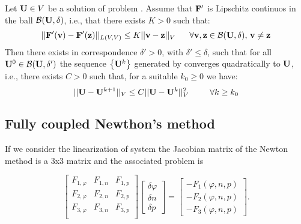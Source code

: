 \begin{Teorema}
\label{theorem: newton convergence}
Let  $\mathbf{U}\in V$ be a solution of problem . Assume that $\mathbf{F'}$ is Lipschitz continuos in the ball $\mathcal{B}(\mathbf{U},\delta)$, i.e., that there exists  $K>0$ such that:
\begin{equation}
||\vect{F'}(\vect{v})-\vect{F'}(\vect{z})||_{L(V,V)} \leq K ||\vect{v}-\vect{z}||_V \psp{10} \forall \vect{v},\vect{z} \in \mathcal{B}(\vect{U},\delta), \, \vect{v}\neq \vect{z}
\end{equation}
Then there exists in correspondence $\delta '>0$, with $\delta '\leq\delta$, such that for all $\mathbf{U}^0 \in \mathcal{B}(\mathbf{U},\delta ')$ the sequence $\left\{ \mathbf{U}^k \right\}$ generated by  converges quadratically to $\mathbf{U}$, i.e., there exists $C>0$ such that, for a suitable $k_0\geq 0$ we have:
\begin{equation}
\label{eq: convergece newton}
||\vect{U}-\vect{U}^{k+1}||_V\leq C||\vect{U}-\vect{U}^k||_V^2 \psp{15} \forall k\geq k_0
\end{equation}
\end{Teorema}


\subsection{Fully coupled Newthon's method}


If we consider the linearization of system  the Jacobian matrix of the Newton method is a 3x3 matrix and the associated problem is

\begin{equation}
\label{eq: NLP algorithm matrix}
\left[
\begin{array}{ccc}
F_{1,\varphi} & F_{1,n} & F_{1,p} \\
F_{2,\varphi} & F_{2,n} & F_{2,p} \\
F_{3,\varphi} & F_{3,n} & F_{3,p} \\
\end{array}
\right]
\left[
\begin{array}{c}
\delta \varphi  \\
\delta n  \\
\delta p 
\end{array}
\right]
=
\left[
\begin{array}{c}
-F_1(\varphi,n,p) \\
-F_2(\varphi,n,p)\\
-F_3(\varphi,n,p)
\end{array}
\right] .
\end{equation}


